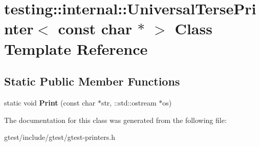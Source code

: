 \hypertarget{classtesting_1_1internal_1_1UniversalTersePrinter_3_01const_01char_01_5_01_4}{}\section{testing\+:\+:internal\+:\+:Universal\+Terse\+Printer$<$ const char $\ast$ $>$ Class Template Reference}
\label{classtesting_1_1internal_1_1UniversalTersePrinter_3_01const_01char_01_5_01_4}
\subsection*{Static Public Member Functions}
\begin{DoxyCompactItemize}
\item 
\mbox{\label{classtesting_1_1internal_1_1UniversalTersePrinter_3_01const_01char_01_5_01_4_a37a3be2d26dc07b24d16c2b5eb88ecda}} 
static void {\bfseries Print} (const char $\ast$str, \+::std\+::ostream $\ast$os)
\end{DoxyCompactItemize}


The documentation for this class was generated from the following file\+:\begin{DoxyCompactItemize}
\item 
gtest/include/gtest/gtest-\/printers.\+h\end{DoxyCompactItemize}
